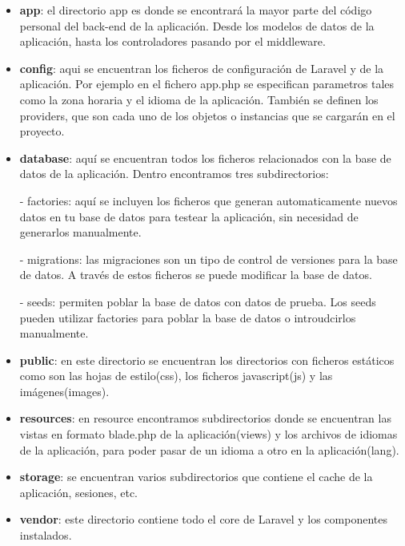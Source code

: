 \begin{itemize}

\item \textbf{app}: el directorio app es donde se encontrará la mayor parte del código personal del back-end de la aplicación. Desde los modelos de datos de la aplicación, hasta los controladores pasando por el middleware.

\item \textbf{config}: aqui se encuentran los ficheros de configuración de Laravel y de la aplicación. Por ejemplo en el fichero app.php se especifican parametros tales como la zona horaria y el idioma de la aplicación. También se definen los providers, que son cada uno de los objetos o instancias que se cargarán en el proyecto. 

\item \textbf{database}: aquí se encuentran todos los ficheros relacionados con la base de datos de la aplicación. Dentro encontramos tres subdirectorios:

- factories: aquí se incluyen los ficheros que generan automaticamente nuevos datos en tu base de datos para testear la aplicación, sin necesidad de generarlos manualmente.

- migrations: las migraciones son un tipo de control de versiones para la base de datos. A través de estos ficheros se puede modificar la base de datos.

- seeds: permiten poblar la base de datos con datos de prueba. Los seeds pueden utilizar factories para poblar la base de datos o introudcirlos manualmente.

\item \textbf{public}: en este directorio se encuentran los directorios con ficheros estáticos como son las hojas de estilo(css), los ficheros javascript(js) y las imágenes(images).

\item \textbf{resources}: en resource encontramos subdirectorios donde se encuentran las vistas  en formato blade.php de la aplicación(views) y los archivos de idiomas de la aplicación, para poder pasar de un idioma a otro en la aplicación(lang).

\item \textbf{storage}: se encuentran varios subdirectorios que contiene el cache de la aplicación, sesiones, etc.

\item \textbf{vendor}: este directorio contiene todo el core de Laravel y los componentes instalados.

\end{itemize}



